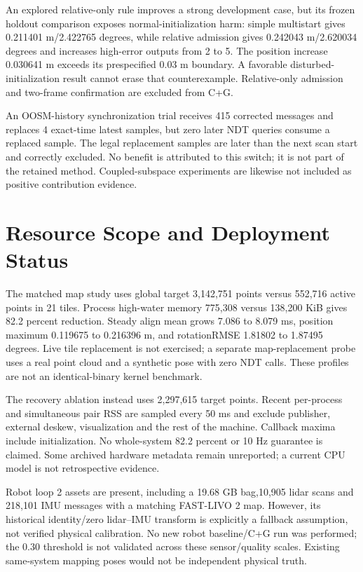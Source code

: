 \documentclass[11 pt,letterpaper]{article}
\begin{document}
An explored relative-only rule improves a strong development case, but its frozen holdout comparison exposes normal-initialization harm: simple multistart gives 0.211401 m/2.422765 degrees, while relative admission gives 0.242043 m/2.620034 degrees and increases high-error outputs from 2 to 5. The position increase 0.030641 m exceeds its prespecified 0.03 m boundary. A favorable disturbed-initialization result cannot erase that counterexample. Relative-only admission and two-frame confirmation are excluded from C+G.

An OOSM-history synchronization trial receives 415 corrected messages and replaces 4 exact-time latest samples, but zero later NDT queries consume a replaced sample. The legal replacement samples are later than the next scan start and correctly excluded. No benefit is attributed to this switch; it is not part of the retained method. Coupled-subspace experiments are likewise not included as positive contribution evidence.

\section{Resource Scope and Deployment Status}
The matched map study uses global target 3,142,751 points versus 552,716 active points in 21 tiles. Process high-water memory 775,308 versus 138,200 KiB gives 82.2 percent reduction. Steady align mean grows 7.086 to 8.079 ms, position maximum 0.119675 to 0.216396 m, and rotationRMSE 1.81802 to 1.87495 degrees. Live tile replacement is not exercised; a separate map-replacement probe uses a real point cloud and a synthetic pose with zero NDT calls. These profiles are not an identical-binary kernel benchmark.

The recovery ablation instead uses 2,297,615 target points. Recent per-process and simultaneous pair RSS are sampled every 50 ms and exclude publisher, external deskew, visualization and the rest of the machine. Callback maxima include initialization. No whole-system 82.2 percent or 10 Hz guarantee is claimed. Some archived hardware metadata remain unreported; a current CPU model is not retrospective evidence.

Robot loop 2 assets are present, including a 19.68 GB bag,10,905 lidar scans and 218,101 IMU messages with a matching FAST-LIVO 2 map. However, its historical identity/zero lidar--IMU transform is explicitly a fallback assumption, not verified physical calibration. No new robot baseline/C+G run was performed; the 0.30 threshold is not validated across these sensor/quality scales. Existing same-system mapping poses would not be independent physical truth.
\end{document}
